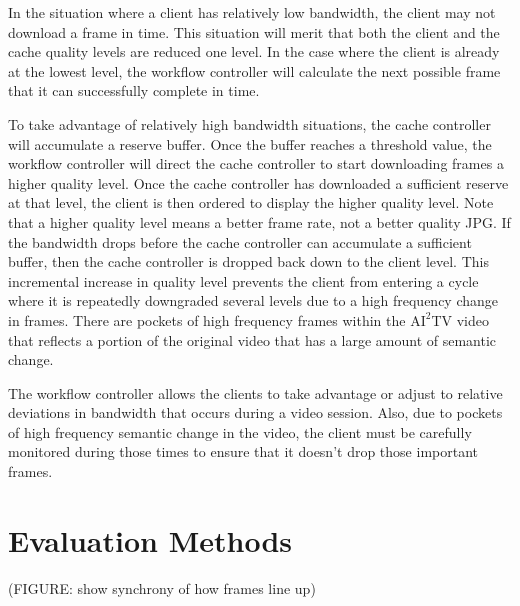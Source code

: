 \documentclass{sig-alternate}
\begin{document}
In the situation where a client has relatively low bandwidth, the
client may not download a frame in time.  This situation will merit
that both the client and the cache quality levels are reduced one
level.  In the case where the client is already at the lowest level,
the workflow controller will calculate the next possible frame that it
can successfully complete in time.

To take advantage of relatively high bandwidth situations, the cache
controller will accumulate a reserve buffer.  Once the buffer reaches
a threshold value, the workflow controller will direct the cache
controller to start downloading frames a higher quality level.  Once
the cache controller has downloaded a sufficient reserve at that
level, the client is then ordered to display the higher quality level.
Note that a higher quality level means a better frame rate, not a
better quality JPG.  If the bandwidth drops before the cache
controller can accumulate a sufficient buffer, then the cache
controller is dropped back down to the client level.  This incremental
increase in quality level prevents the client from entering a cycle
where it is repeatedly downgraded several levels due to a high
frequency change in frames.  There are pockets of high frequency
frames within the $\mathrm{AI}^2$TV video that reflects a portion of
the original video that has a large amount of semantic change.

The workflow controller allows the clients to take advantage or adjust
to relative deviations in bandwidth that occurs during a video
session.  Also, due to pockets of high frequency semantic change in
the video, the client must be carefully monitored during those times
to ensure that it doesn't drop those important frames.

\section{Evaluation Methods} \label{eval}

(FIGURE: show synchrony of how frames line up)
\end{document}
